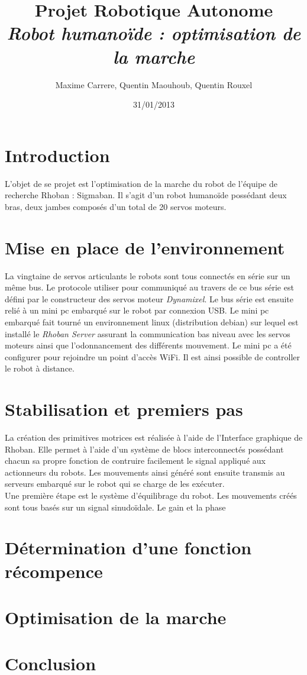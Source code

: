 \documentclass[11pt]{article}
\title{Projet Robotique Autonome\\
\textit{Robot humanoïde : optimisation de la marche}}
\author{Maxime Carrere, Quentin Maouhoub, Quentin Rouxel}
\date{31/01/2013}
\begin{document}
\maketitle

\section{Introduction}

L'objet de se projet est l'optimisation de la marche du robot de l'équipe 
de recherche Rhoban : Sigmaban. Il s'agit d'un robot humanoïde possédant deux bras,
deux jambes composés d'un total de 20 servos moteurs.

\section{Mise en place de l'environnement}

La vingtaine de servos articulants le robots sont tous connectés en série sur un même 
bus. Le protocole utiliser pour communiqué au travers de ce bus série est défini par le
constructeur des servos moteur \textit{Dynamixel}. Le bus série est ensuite relié à un mini pc
embarqué sur le robot par connexion USB. Le mini pc embarqué fait tourné un environnement linux
(distribution debian) sur lequel est installé le \textit{Rhoban Server} assurant la communication
bas niveau avec les servos moteurs ainsi que l'odonnancement des différents mouvement. Le mini pc
a été configurer pour rejoindre un point d'accès WiFi. Il est ainsi possible de controller le robot
à distance.

\section{Stabilisation et premiers pas}

La création des primitives motrices est réalisée à l'aide de l'Interface graphique de Rhoban.
Elle permet à l'aide d'un système de blocs interconnectés possédant chacun sa propre fonction
de contruire facilement le signal appliqué aux actionneurs du robots. Les mouvements ainsi généré
sont ensuite transmis au serveurs embarqué sur le robot qui se charge de les exécuter.\\

Une première étape est le système d'équilibrage du robot. 
Les mouvements créés sont tous basés sur un signal sinudoïdale. Le gain et la phase

\section{Détermination d'une fonction récompence}
\section{Optimisation de la marche}
\section{Conclusion}
\end{document}
